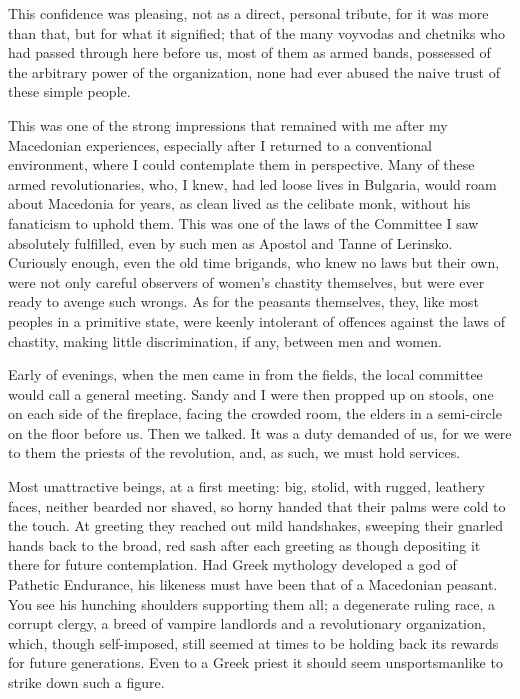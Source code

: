 \documentclass[a5paper,12pt]{book}
\begin{document}
This confidence was pleasing, not as a direct, personal tribute, for it was more than that, but for what it signified; that of the many voyvodas and chetniks who had passed through here before us, most of them as armed bands, possessed of the arbitrary power of the organization, none had ever abused the naive trust of these simple people. 

This was one of the strong impressions that remained with me after my Macedonian experiences, especially after I returned to a conventional environment, where I could contemplate them in perspective. Many of these armed revolutionaries, who, I knew, had led loose lives in Bulgaria, would roam about Macedonia for years, as clean lived as the celibate monk, without his fanaticism to uphold them. This was one of the laws of the Committee I saw absolutely fulfilled, even by such men as Apostol and Tanne of Lerinsko. Curiously enough, even the old time brigands, who knew no laws but their own, were not only careful observers of women’s chastity themselves, but were ever ready to avenge such wrongs. As for the peasants themselves, they, like most peoples in a primitive state, were keenly intolerant of offences against the laws of chastity, making little discrimination, if any, between men and women. 

Early of evenings, when the men came in from the fields, the local committee would call a general meeting. Sandy and I were then propped up on stools, one on each side of the fireplace, facing the crowded room, the elders in a semi-circle on the floor before us. Then we talked. It was a duty demanded of us, for we were to them the priests of the revolution, and, as such, we must hold services. 

Most unattractive beings, at a first meeting: big, stolid, with rugged, leathery faces, neither bearded nor shaved, so horny handed that their palms were cold to the touch. At greeting they reached out mild handshakes, sweeping their gnarled hands back to the broad, red sash after each greeting as though depositing it there for future contemplation. Had Greek mythology developed a god of Pathetic Endurance, his likeness must have been that of a Macedonian peasant. You see his hunching shoulders supporting them all; a degenerate ruling race, a corrupt clergy, a breed of vampire landlords and a revolutionary organization, which, though self-imposed, still seemed at times to be holding back its rewards for future generations. Even to a Greek priest it should seem unsportsmanlike to strike down such a figure. 
\end{document}
